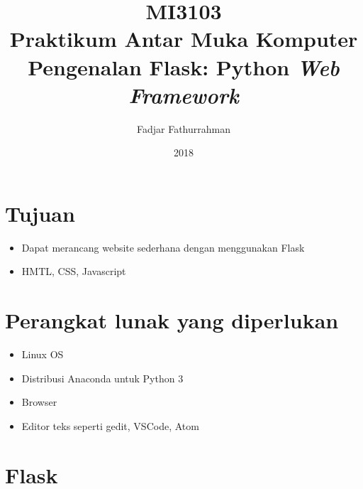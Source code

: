 \documentclass[a4paper,11pt]{extarticle}
\title{
MI3103 \\
Praktikum Antar Muka Komputer\\
Pengenalan Flask: Python \textit{Web Framework}}
\author{Fadjar Fathurrahman}
\date{2018}
\begin{document}
\maketitle

\section{Tujuan}
\begin{itemize}
\item Dapat merancang website sederhana dengan menggunakan Flask
\item HMTL, CSS, Javascript
\end{itemize}

\section{Perangkat lunak yang diperlukan}
\begin{itemize}
\item Linux OS
\item Distribusi Anaconda untuk Python 3
\item Browser
\item Editor teks seperti \textsf{gedit}, \textsf{VSCode}, \textsf{Atom}
\end{itemize}

\section{Flask}
\end{document}
